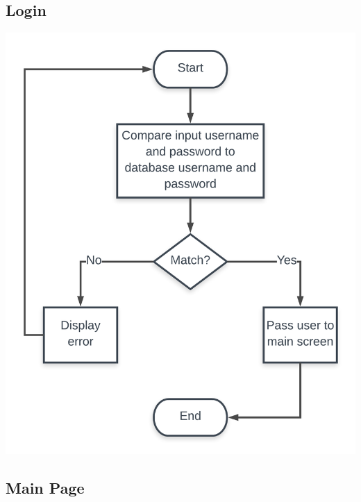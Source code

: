 \documentclass{scrreprt}
\begin{document}
\subsection*{Login}

\begin{center}
    \includegraphics[width=0.9\linewidth]{images/flowLogin.png}
\end{center}

\subsection*{Main Page}
\end{document}
